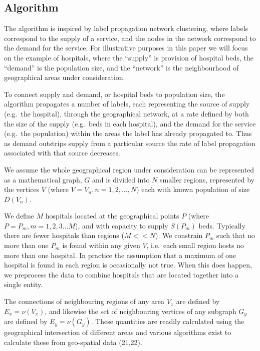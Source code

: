 \documentclass[
]{article}
\begin{document}
\hypertarget{algorithm}{%
\subsection{Algorithm}\label{algorithm}}

The algorithm is inspired by label propagation network clustering, where
labels correspond to the supply of a service, and the nodes in the
network correspond to the demand for the service. For illustrative
purposes in this paper we will focus on the example of hospitals, where
the ``supply'' is provision of hospital beds, the ``demand'' is the
population size, and the ``network'' is the neighbourhood of
geographical areas under consideration.

To connect supply and demand, or hospital beds to population size, the
algorithm propagates a number of labels, each representing the source of
supply (e.g.~the hospital), through the geographical network, at a rate
defined by both the size of the supply (e.g.~beds in each hospital), and
the demand for the service (e.g.~the population) within the areas the
label has already propagated to. Thus as demand outstrips supply from a
particular source the rate of label propagation associated with that
source decreases.

We assume the whole geographical region under consideration can be
represented as a mathematical graph, \(G\) and is divided into \(N\)
smaller regions, represented by the vertices \(V\) (where
\(V=V_n, n = 1,2, \dots, N\)) each with known population of size
\(D(V_n)\).

We define \(M\) hospitals located at the geographical points \(P\)
(where \(P = P_m, m = 1,2,3 \dots M\)), and with capacity to supply
\(S(P_m)\) beds. Typically there are fewer hospitals than regions
(\(M<<N\)). We constrain \(P_m\) such that no more than one \(P_m\) is
found within any given \(V\), i.e.~each small region hosts no more than
one hospital. In practice the assumption that a maximum of one hospital
is found in each region is occasionally not true. When this does happen,
we preprocess the data to combine hospitals that are located together
into a single entity.

The connections of neighbouring regions of any area \(V_x\) are defined
by \(E_x = \nu(V_x)\), and likewise the set of neighbouring vertices of
any subgraph \(G_y\) are defined by \(E_y = \nu(G_y)\). These quantities
are readily calculated using the geographical intersection of different
areas and various algorithms exist to calculate these from geo-spatial
data (21,22).
\end{document}
